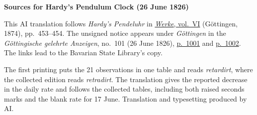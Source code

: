 \clearpage\thispagestyle{empty}
\begin{center}\textbf{Sources for Hardy’s Pendulum Clock (26 June 1826)}\end{center}
\noindent This AI translation follows \textit{Hardy’s Pendeluhr} in \href{https://gdz.sub.uni-goettingen.de/id/PPN236007467}{\textit{Werke}, vol.~VI} (Göttingen, 1874), pp.~453--454. The unsigned notice appears under \textit{Göttingen} in the \textit{Göttingische gelehrte Anzeigen}, no.~101 (26 June 1826), \href{https://api.digitale-sammlungen.de/iiif/image/v2/bsb10538704_00329/full/1550,/0/default.jpg}{p.~1001} and \href{https://api.digitale-sammlungen.de/iiif/image/v2/bsb10538704_00330/full/1550,/0/default.jpg}{p.~1002}. The links lead to the Bavarian State Library’s copy.
\par\smallskip\noindent The first printing puts the 21 observations in one table and reads \textit{retardirt}, where the collected edition reads \textit{retradirt}. The translation gives the reported decrease in the daily rate and follows the collected tables, including both raised seconds marks and the blank rate for 17 June. Translation and typesetting produced by AI.
\clearpage

